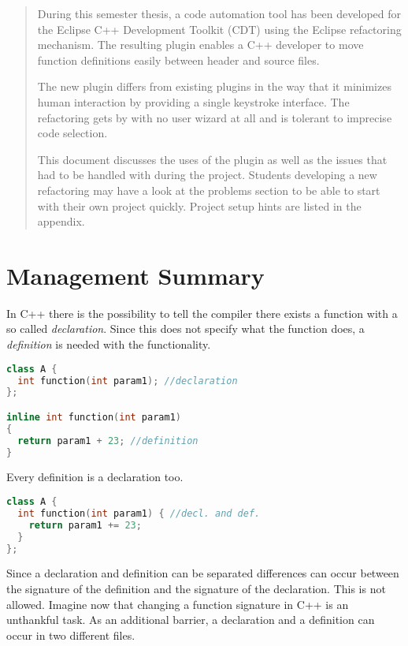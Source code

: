 \begin{abstract}

During this semester thesis, a code automation tool has been developed for the 
Eclipse C++ Development Toolkit (CDT) using the Eclipse refactoring mechanism. 
The resulting plugin enables a C++ developer to move function definitions easily 
between header and source files.

The new plugin differs from existing plugins in the way that it minimizes human 
interaction by providing a single keystroke interface. The refactoring gets by 
with no user wizard at all and is tolerant to imprecise code selection. 

This document discusses the uses of the plugin as well as the issues that had 
to be handled with during the project. Students developing a new refactoring may 
have a look at the problems section to be able to start with their own project 
quickly. Project setup hints are listed in the appendix.
\end{abstract}

\chapter*{Management Summary}
In C++ there is the possibility to tell the compiler there exists a function
with a so called \textit{declaration}. Since
this does not specify what the function does, a \textit{definition} is needed
with the functionality.

\begin{lstlisting}[caption={class with declaration and definition},
label={declanddef}, language=C++]
class A {
  int function(int param1); //declaration
};

inline int function(int param1)
{
  return param1 + 23; //definition
}
\end{lstlisting}

Every definition is a declaration too.

\begin{lstlisting}[caption={class with declaration and definition},
label={defonly}, language=C++]
class A {
  int function(int param1) { //decl. and def.
    return param1 += 23;
  }
};
\end{lstlisting}

Since a declaration and definition can be separated differences can occur
between the signature of the definition and the signature of the declaration.
This is not allowed. 
Imagine now that changing a function signature in C++ is an unthankful task.
As an additional barrier, a declaration and a definition can occur in two
different files.

